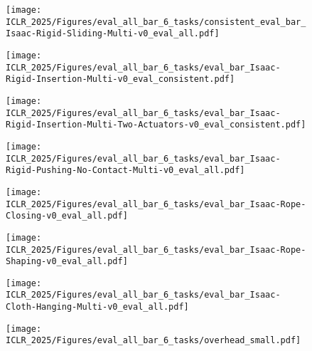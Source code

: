 \begin{figure*}[t]
    \centering
       

        \centering
        \begin{subfigure}[b]{0.24\linewidth}
            \texttt{[image: ICLR\_2025/Figures/eval\_all\_bar\_6\_tasks/consistent\_eval\_bar\_Isaac-Rigid-Sliding-Multi-v0\_eval\_all.pdf]}
        \end{subfigure}
        \hfill
        \begin{subfigure}[b]{0.24\linewidth}
            \texttt{[image: ICLR\_2025/Figures/eval\_all\_bar\_6\_tasks/eval\_bar\_Isaac-Rigid-Insertion-Multi-v0\_eval\_consistent.pdf]}
        \end{subfigure}
        \hfill
        \begin{subfigure}[b]{0.24\linewidth}
            \texttt{[image: ICLR\_2025/Figures/eval\_all\_bar\_6\_tasks/eval\_bar\_Isaac-Rigid-Insertion-Multi-Two-Actuators-v0\_eval\_consistent.pdf]}
        \end{subfigure}
        \hfill
        \begin{subfigure}[b]{0.24\linewidth}
            \texttt{[image: ICLR\_2025/Figures/eval\_all\_bar\_6\_tasks/eval\_bar\_Isaac-Rigid-Pushing-No-Contact-Multi-v0\_eval\_all.pdf]}
        \end{subfigure}

        
        \begin{subfigure}[b]{0.24\linewidth}
            \texttt{[image: ICLR\_2025/Figures/eval\_all\_bar\_6\_tasks/eval\_bar\_Isaac-Rope-Closing-v0\_eval\_all.pdf]}
        \end{subfigure}
        \hfill
        \begin{subfigure}[b]{0.24\linewidth}
            \texttt{[image: ICLR\_2025/Figures/eval\_all\_bar\_6\_tasks/eval\_bar\_Isaac-Rope-Shaping-v0\_eval\_all.pdf]}
        \end{subfigure}
        \hfill
        \begin{subfigure}[b]{0.24\linewidth}
            \texttt{[image: ICLR\_2025/Figures/eval\_all\_bar\_6\_tasks/eval\_bar\_Isaac-Cloth-Hanging-Multi-v0\_eval\_all.pdf]}
        \end{subfigure}
        \hfill
        \begin{subfigure}[b]{0.24\linewidth}
            \texttt{[image: ICLR\_2025/Figures/eval\_all\_bar\_6\_tasks/overhead\_small.pdf]}
        \end{subfigure}

    \label{fig:eval_attention}
\end{figure*}
